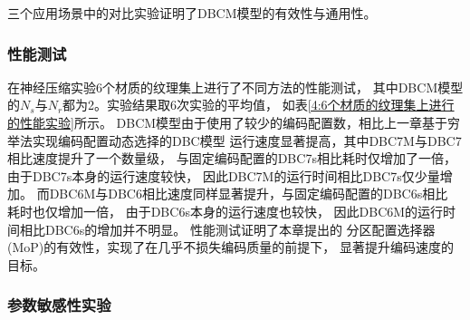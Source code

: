 三个应用场景中的对比实验证明了DBCM模型的有效性与通用性。

\subsubsection{性能测试}

在神经压缩实验6个材质的纹理集上进行了不同方法的性能测试，
其中DBCM模型的$N_s$与$N_r$都为2。实验结果取6次实验的平均值，
如表\ref{4:6个材质的纹理集上进行的性能实验}所示。
DBCM模型由于使用了较少的编码配置数，相比上一章基于穷举法实现编码配置动态选择的DBC模型
运行速度显著提高，其中DBC7M与DBC7相比速度提升了一个数量级，
与固定编码配置的DBC7s相比耗时仅增加了一倍，
由于DBC7s本身的运行速度较快，
因此DBC7M的运行时间相比DBC7s仅少量增加。
而DBC6M与DBC6相比速度同样显著提升，与固定编码配置的DBC6s相比
耗时也仅增加一倍，
由于DBC6s本身的运行速度也较快，
因此DBC6M的运行时间相比DBC6s的增加并不明显。
性能测试证明了本章提出的
分区配置选择器(MoP)的有效性，实现了在几乎不损失编码质量的前提下，
显著提升编码速度的目标。

\begin{table*}[htbp]
    \centering
    \caption{6个材质的纹理集上进行的性能实验}
    \label{4:6个材质的纹理集上进行的性能实验}        
\end{table*}

\subsubsection{参数敏感性实验}

